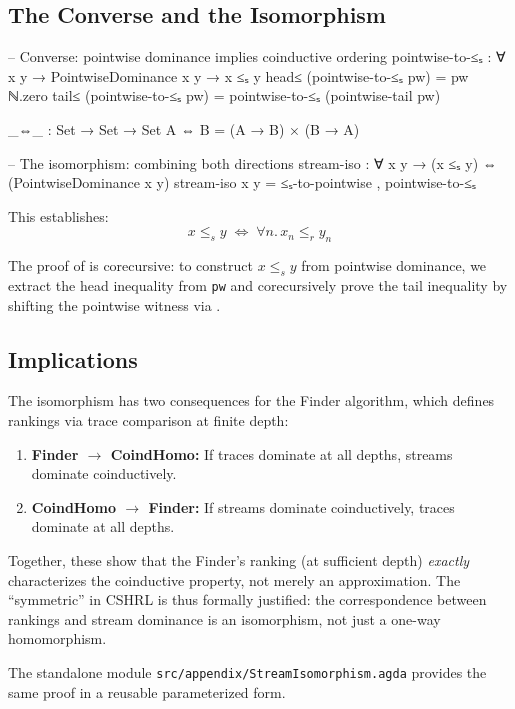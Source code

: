 \documentclass[9pt,a4paper]{article}
\theoremstyle{plain}
\theoremstyle{definition}
\theoremstyle{remark}
\begin{document}
\subsection{The Converse and the Isomorphism}

\begin{code}
  -- Converse: pointwise dominance implies coinductive ordering
  pointwise-to-≤ₛ : ∀ {x y} → PointwiseDominance x y → x ≤ₛ y
  head≤ (pointwise-to-≤ₛ pw) = pw ℕ.zero
  tail≤ (pointwise-to-≤ₛ pw) = pointwise-to-≤ₛ (pointwise-tail pw)

  _⇔_ : Set → Set → Set
  A ⇔ B = (A → B) × (B → A)

  -- The isomorphism: combining both directions
  stream-iso : ∀ x y → (x ≤ₛ y) ⇔ (PointwiseDominance x y)
  stream-iso x y = ≤ₛ-to-pointwise , pointwise-to-≤ₛ
\end{code}

\noindent This establishes:
\[
x \le_s y \;\Longleftrightarrow\; \forall n.\, x_n \le_r y_n
\]

The proof of  is corecursive: to construct $x \le_s y$ from pointwise dominance, we extract the head inequality from \texttt{pw} and corecursively prove the tail inequality by shifting the pointwise witness via .

\subsection{Implications}

The isomorphism has two consequences for the Finder algorithm, which defines rankings via trace comparison at finite depth:
\begin{enumerate}
\item \textbf{Finder $\to$ CoindHomo:} If traces dominate at all depths, streams dominate coinductively.
\item \textbf{CoindHomo $\to$ Finder:} If streams dominate coinductively, traces dominate at all depths.
\end{enumerate}

\noindent Together, these show that the Finder's ranking (at sufficient depth) \emph{exactly} characterizes the coinductive property, not merely an approximation.  The ``symmetric'' in CSHRL is thus formally justified: the correspondence between rankings and stream dominance is an isomorphism, not just a one-way homomorphism.

The standalone module \texttt{src/appendix/StreamIsomorphism.agda} provides the same proof in a reusable parameterized form.
\end{document}
